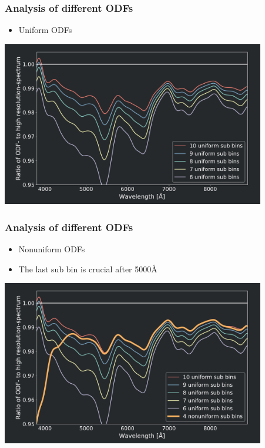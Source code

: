 \frame
{
	\frametitle{Analysis of different ODFs}
	\begin{itemize}
	\item Uniform ODFs
	\end{itemize}
	
	\centering
	\includegraphics[width=115mm]{images/6_10_vs_best_4_0}
}
\frame
{
	\frametitle{Analysis of different ODFs}
	\begin{itemize}
		\item Nonuniform ODFs
		\item The last sub bin is crucial after 5000\si{\angstrom}
    \end{itemize}	  
	\centering
	\includegraphics[width=115mm]{images/6_10_vs_best_4_1}
}
\frame
